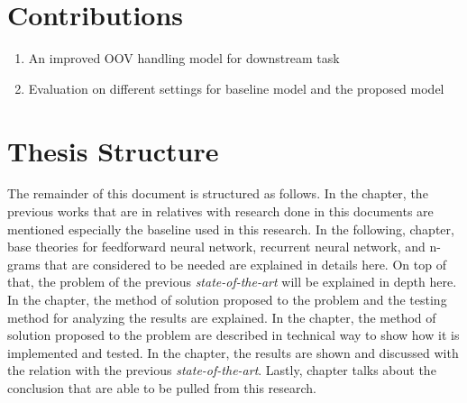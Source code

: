 \section{Contributions}
    \begin{enumerate}
        \item An improved OOV handling model for downstream task
        \item Evaluation on different settings for baseline model and
        the proposed model
    \end{enumerate}

\section{Thesis Structure}
    The remainder of this document is structured as follows. In the
     chapter, the previous works that are in
    relatives with research done in this documents are mentioned
    especially the baseline used in this research. In the following,
     chapter, base theories for
    feedforward neural network, recurrent neural network, and n-grams
    that are considered to be needed are explained in details here. On
    top of that, the problem of the previous \textit{state-of-the-art}
    will be explained in depth here. In the 
    chapter, the method of solution proposed to the problem and the
    testing method for analyzing the results are explained. In the
     chapter, the method of solution
    proposed to the problem are described in technical way to show how
    it is implemented and tested. In the 
    chapter, the results are shown and discussed with the relation
    with the previous \textit{state-of-the-art}. Lastly,
     chapter talks about the conclusion that are
    able to be pulled from this research.
